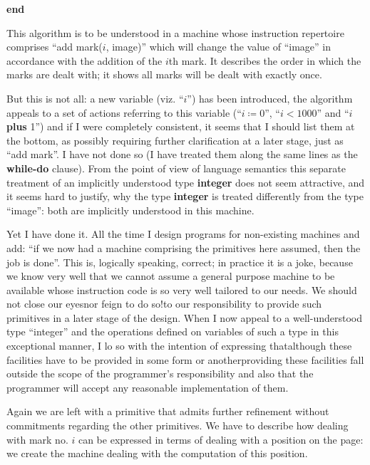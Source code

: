 \textbf{end}

\noindent
This algorithm is to be understood in a machine whose instruction repertoire comprises ``add mark($i$, image)'' which will change the value of ``image'' in accordance with the addition of the $i$th mark. It describes the order in which the marks are dealt with; it shows all marks will be dealt with exactly once.

But this is not all: a new variable (viz. ``$i$'') has been introduced, the algorithm appeals to a set of actions referring to this variable (``$i \coloneq 0$'', \mbox{``$i < 1000$''} and ``$i$ \textbf{plus} 1'') and if I were completely consistent, it seems that I should list them at the bottom, as possibly requiring further clarification at a later stage, just as ``add mark''. I have not done so (I have treated them along the same lines as the \textbf{while-do} clause). From the point of view of language semantics this separate treatment of an implicitly understood type \textbf{integer} does not seem attractive, and it seems hard to justify, why the type \textbf{integer} is treated differently from the type ``image'': both are implicitly understood in this machine.

Yet I have done it. All the time I design programs for non-existing machines and add: ``if we now had a machine comprising the primitives here assumed, then the job is done''. This is, logically speaking, correct; in practice it is a joke, because we know very well that we cannot assume a general purpose machine to be available whose instruction code is so very well tailored to our needs. We should not close our eyes\textemdash{}nor feign to do so!\textemdash{}to our responsibility to provide such primitives in a later stage of the design. When I now appeal to a well-understood type ``integer'' and the operations defined on variables of such a type in this exceptional manner, I lo so with the intention of expressing that\textemdash{}although these facilities have to be provided in some form or another\textemdash{}providing these facilities fall outside the scope of the programmer's responsibility and also that the programmer will accept any reasonable implementation of them.

Again we are left with a primitive that admits further refinement without commitments regarding the other primitives. We have to describe how dealing with mark no. $i$ can be expressed in terms of dealing with a position on the page: we create the machine dealing with the computation of this position.

